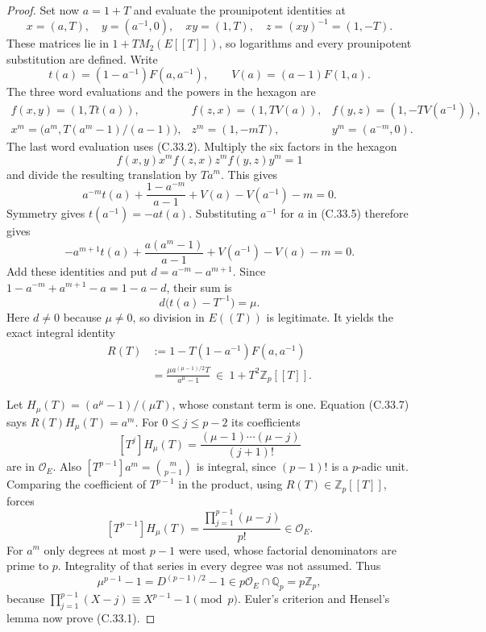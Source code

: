 \begin{proof}
Set now $a=1+T$ and evaluate the prounipotent identities at
\[
 x=(a,T),\quad y=(a^{-1},0),\quad
 xy=(1,T),\quad z=(xy)^{-1}=(1,-T).                             \tag{C.33.3}
\]
These matrices lie in $1+T M_2(E[[T]])$, so logarithms and every
prounipotent substitution are defined. Write
\[
 t(a)=(1-a^{-1})F(a,a^{-1}),\qquad V(a)=(a-1)F(1,a).
\]
The three word evaluations and the powers in the hexagon are
\[
 \begin{array}{lll}
 f(x,y)=(1,Tt(a)),& f(z,x)=(1,TV(a)),&
 f(y,z)=(1,-TV(a^{-1})),\\[2pt]
 x^m=\bigl(a^m,T(a^m-1)/(a-1)\bigr),&
 z^m=(1,-mT),&y^m=(a^{-m},0).
 \end{array}                                                    \tag{C.33.4}
\]
The last word evaluation uses (C.33.2). Multiply the six factors
in the hexagon
\[
                    f(x,y)x^m f(z,x)z^m f(y,z)y^m=1
\]
and divide the resulting translation by $Ta^m$. This gives
\[
 a^{-m}t(a)+\frac{1-a^{-m}}{a-1}
                  +V(a)-V(a^{-1})-m=0.                         \tag{C.33.5}
\]
Symmetry gives $t(a^{-1})=-a t(a)$. Substituting $a^{-1}$ for
$a$ in (C.33.5) therefore gives
\[
 -a^{m+1}t(a)+\frac{a(a^m-1)}{a-1}
                  +V(a^{-1})-V(a)-m=0.                         \tag{C.33.6}
\]
Add these identities and put $d=a^{-m}-a^{m+1}$. Since
$1-a^{-m}+a^{m+1}-a=1-a-d$, their sum is
\[
                         d\bigl(t(a)-T^{-1}\bigr)=\mu.
\]
Here $d\ne0$ because $\mu\ne0$, so division in $E((T))$ is
legitimate. It yields the exact integral identity
\[
 \begin{split}
 R(T)&:=1-T(1-a^{-1})F(a,a^{-1})\\
     &=\frac{\mu a^{(\mu-1)/2}T}{a^\mu-1}
             \ \in\ 1+T^2\mathbb Z_p[[T]].
 \end{split}                                                    \tag{C.33.7}
\]

Let $H_\mu(T)=(a^\mu-1)/(\mu T)$, whose constant term is one.
Equation (C.33.7) says $R(T)H_\mu(T)=a^m$. For
$0\leq j\leq p-2$ its coefficients
\[
 [T^j]H_\mu(T)=\frac{(\mu-1)\cdots(\mu-j)}{(j+1)!}
\]
are in $\mathcal O_E$. Also
$[T^{p-1}]a^m=\binom{m}{p-1}$ is integral, since $(p-1)!$ is
a $p$-adic unit. Comparing the coefficient of $T^{p-1}$ in the
product, using $R(T)\in\mathbb Z_p[[T]]$, forces
\[
     [T^{p-1}]H_\mu(T)
       =\frac{\prod_{j=1}^{p-1}(\mu-j)}{p!}\in\mathcal O_E.
\]
For $a^m$ only degrees at most $p-1$ were used, whose factorial
denominators are prime to $p$. Integrality of that series in every
degree was not assumed. Thus
\[
 \mu^{p-1}-1=D^{(p-1)/2}-1\in p\mathcal O_E\cap\mathbb Q_p
                                      =p\mathbb Z_p,
\]
because $\prod_{j=1}^{p-1}(X-j)\equiv X^{p-1}-1\pmod p$.
Euler's criterion and Hensel's lemma now prove (C.33.1).


\end{proof}
